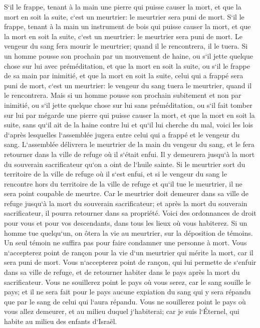 \verse S`il le frappe, tenant à la main une pierre qui puisse causer la mort, et que la mort en soit la suite, c`est un meurtrier: le meurtrier sera puni de mort. 
\verse S`il le frappe, tenant à la main un instrument de bois qui puisse causer la mort, et que la mort en soit la suite, c`est un meurtrier: le meurtrier sera puni de mort. 
\verse Le vengeur du sang fera mourir le meurtrier; quand il le rencontrera, il le tuera. 
\verse Si un homme pousse son prochain par un mouvement de haine, ou s`il jette quelque chose sur lui avec préméditation, et que la mort en soit la suite, 
\verse ou s`il le frappe de sa main par inimitié, et que la mort en soit la suite, celui qui a frappé sera puni de mort, c`est un meurtrier: le vengeur du sang tuera le meurtrier, quand il le rencontrera. 
\verse Mais si un homme pousse son prochain subitement et non par inimitié, ou s`il jette quelque chose sur lui sans préméditation, 
\verse ou s`il fait tomber sur lui par mégarde une pierre qui puisse causer la mort, et que la mort en soit la suite, sans qu`il ait de la haine contre lui et qu`il lui cherche du mal, 
\verse voici les lois d`après lesquelles l`assemblée jugera entre celui qui a frappé et le vengeur du sang. 
\verse L`assemblée délivrera le meurtrier de la main du vengeur du sang, et le fera retourner dans la ville de refuge où il s`était enfui. Il y demeurera jusqu`à la mort du souverain sacrificateur qu`on a oint de l`huile sainte. 
\verse Si le meurtrier sort du territoire de la ville de refuge où il s`est enfui, 
\verse et si le vengeur du sang le rencontre hors du territoire de la ville de refuge et qu`il tue le meurtrier, il ne sera point coupable de meurtre. 
\verse Car le meurtrier doit demeurer dans sa ville de refuge jusqu`à la mort du souverain sacrificateur; et après la mort du souverain sacrificateur, il pourra retourner dans sa propriété. 
\verse Voici des ordonnances de droit pour vous et pour vos descendants, dans tous les lieux où vous habiterez. 
\verse Si un homme tue quelqu`un, on ôtera la vie au meurtrier, sur la déposition de témoins. Un seul témoin ne suffira pas pour faire condamner une personne à mort. 
\verse Vous n`accepterez point de rançon pour la vie d`un meurtrier qui mérite la mort, car il sera puni de mort. 
\verse Vous n`accepterez point de rançon, qui lui permette de s`enfuir dans sa ville de refuge, et de retourner habiter dans le pays après la mort du sacrificateur. 
\verse Vous ne souillerez point le pays où vous serez, car le sang souille le pays; et il ne sera fait pour le pays aucune expiation du sang qui y sera répandu que par le sang de celui qui l`aura répandu. 
\verse Vous ne souillerez point le pays où vous allez demeurer, et au milieu duquel j`habiterai; car je suis l`Éternel, qui habite au milieu des enfants d`Israël. 

